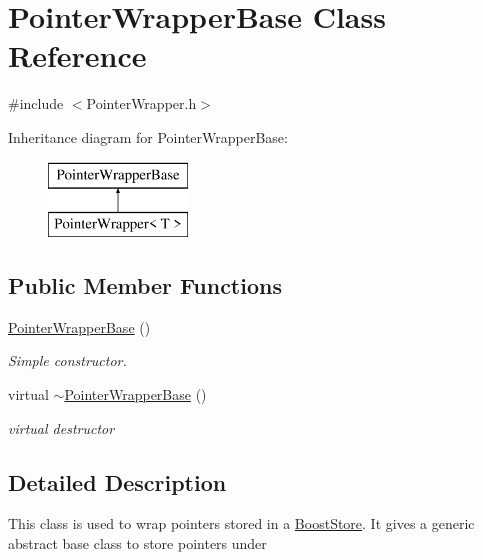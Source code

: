 \hypertarget{classPointerWrapperBase}{\section{Pointer\-Wrapper\-Base Class Reference}
\label{classPointerWrapperBase}
}


{\ttfamily \#include $<$Pointer\-Wrapper.\-h$>$}

Inheritance diagram for Pointer\-Wrapper\-Base\-:\begin{figure}[H]
\begin{center}
\leavevmode
\includegraphics[height=2.000000cm]{classPointerWrapperBase}
\end{center}
\end{figure}
\subsection*{Public Member Functions}
\begin{DoxyCompactItemize}
\item 
\hypertarget{classPointerWrapperBase_ac9e248557a8aa248bcbbadc469c77f52}{\hyperlink{classPointerWrapperBase_ac9e248557a8aa248bcbbadc469c77f52}{Pointer\-Wrapper\-Base} ()}\label{classPointerWrapperBase_ac9e248557a8aa248bcbbadc469c77f52}

\begin{DoxyCompactList}\small\item\em Simple constructor. \end{DoxyCompactList}\item 
\hypertarget{classPointerWrapperBase_a842fb0af38187d71678971452c1e1094}{virtual \hyperlink{classPointerWrapperBase_a842fb0af38187d71678971452c1e1094}{$\sim$\-Pointer\-Wrapper\-Base} ()}\label{classPointerWrapperBase_a842fb0af38187d71678971452c1e1094}

\begin{DoxyCompactList}\small\item\em virtual destructor \end{DoxyCompactList}\end{DoxyCompactItemize}


\subsection{Detailed Description}
This class is used to wrap pointers stored in a \hyperlink{classBoostStore}{Boost\-Store}. It gives a generic abstract base class to store pointers under

